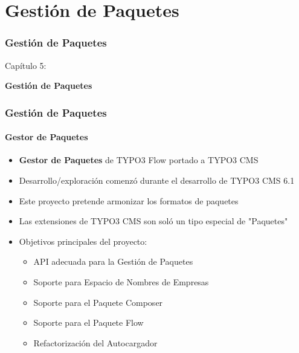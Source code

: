 %

\section{Gestión de Paquetes}
\begin{frame}[fragile]
	\frametitle{Gestión de Paquetes}

	\begin{center}\huge{Capítulo 5:}\end{center}
	\begin{center}\huge{\color{typo3darkgrey}\textbf{Gestión de Paquetes}}\end{center}

\end{frame}


\begin{frame}[fragile]
	\frametitle{Gestión de Paquetes}
	\framesubtitle{Gestor de Paquetes}

	\begin{itemize}
		\item \textbf{Gestor de Paquetes} de TYPO3 Flow portado a TYPO3 CMS
		\item Desarrollo/exploración comenzó durante el desarrollo de TYPO3 CMS 6.1
		\item Este proyecto pretende armonizar los formatos de paquetes
		\item Las extensiones de TYPO3 CMS son soló un tipo especial de "Paquetes"
		\item Objetivos principales del proyecto:

			\begin{itemize}
				\item API adecuada para la Gestión de Paquetes
				\item Soporte para Espacio de Nombres de Empresas
				\item Soporte para el Paquete Composer
				\item Soporte para el Paquete Flow
				\item Refactorización del Autocargador
			\end{itemize}

	\end{itemize}

\end{frame}

